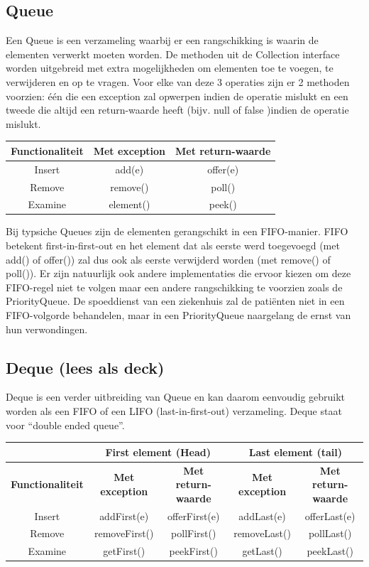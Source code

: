 \documentclass{tstextbook}
\begin{document}
\subsection{Queue}
Een Queue is een verzameling waarbij er een rangschikking is waarin de elementen verwerkt moeten worden. De methoden uit de Collection interface worden uitgebreid met extra mogelijkheden om elementen toe te voegen, te verwijderen en op te vragen. Voor elke van deze 3 operaties zijn er 2 methoden voorzien: \'e\'en die een exception zal opwerpen indien de operatie mislukt en een tweede die altijd een return-waarde heeft (bijv. null of false )indien de operatie mislukt. 

\vspace{4mm}
\begin{tabular}{| c | c |  c |} 
\hline
\textbf{Functionaliteit} & \textbf{Met exception} & \textbf{Met return-waarde}\\
\hline
Insert & add(e) & offer(e)\\
Remove & remove() & poll()\\
Examine & element() & peek()\\
\hline
\end{tabular}
\vspace{4mm}

\noindent Bij typsiche Queues zijn de elementen gerangschikt in een FIFO-manier. 
FIFO betekent first-in-first-out en het element dat als eerste werd toegevoegd (met add() of offer()) zal dus ook als eerste verwijderd worden (met remove() of poll()).
Er zijn natuurlijk ook andere implementaties die ervoor kiezen om deze FIFO-regel niet te volgen maar een andere rangschikking te voorzien zoals de PriorityQueue. De spoeddienst van een ziekenhuis zal de pati\"enten niet in een FIFO-volgorde behandelen, maar in een PriorityQueue naargelang de ernst van hun verwondingen.

\subsection{Deque (lees als deck)}

Deque is een verder uitbreiding van Queue en kan daarom eenvoudig gebruikt worden als een FIFO of een LIFO (last-in-first-out) verzameling. Deque staat voor ``double ended queue''.

\vspace{4mm}
\begin{tabular}{| c | c |  c  | c | c |} 
\hline 
 &  \multicolumn{2}{c|}{First element (Head)} &  \multicolumn{2}{c|}{Last element (tail)} \\
\hline
\textbf{Functionaliteit} & \textbf{Met exception} & \textbf{Met return-waarde} & \textbf{Met exception} & \textbf{Met return-waarde} \\
\hline
Insert & addFirst(e)	 & offerFirst(e) &	addLast(e) &	offerLast(e)\\
Remove & removeFirst()	& pollFirst()	& removeLast()	& pollLast() \\
Examine &	getFirst()	& peekFirst()	& getLast() &	peekLast()\\
\hline
\end{tabular}
\vspace{4mm}
\end{document}
